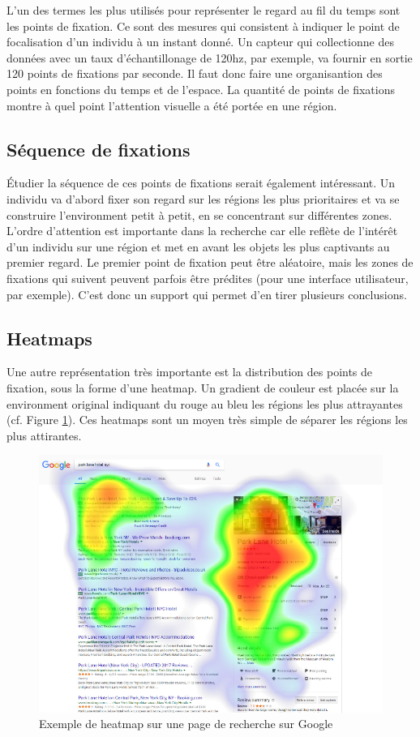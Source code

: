 \documentclass[12pt]{article}
\begin{document}
L'un des termes les plus utilisés pour représenter le regard au fil du temps
sont les points de fixation. Ce sont des mesures qui consistent à indiquer
le point de focalisation d'un individu à un instant donné. Un capteur qui
collectionne des données avec un taux d'échantillonage de 120hz, par exemple, va
fournir en sortie 120 points de fixations par seconde. Il faut donc faire une
organisantion des points en fonctions du temps et de l'espace. La quantité de
points de fixations montre à quel point l'attention visuelle a été portée en une
région.

\subsection{Séquence de fixations}

Étudier la séquence de ces points de fixations serait également intéressant. Un
individu va d'abord fixer son regard sur les régions les plus prioritaires et va
se construire l'environment petit à petit, en se concentrant sur différentes
zones. L'ordre d'attention est importante dans la recherche car elle reflète de
l'intérêt d'un individu sur une région et met en avant les objets les plus
captivants au premier regard. Le premier point de fixation peut être aléatoire,
mais les zones de fixations qui suivent peuvent parfois être prédites (pour
une interface utilisateur, par exemple). C'est donc un support qui permet d'en
tirer plusieurs conclusions.

\subsection{Heatmaps}

Une autre représentation très importante est la distribution des points de
fixation, sous la forme d'une heatmap. Un gradient de couleur est placée sur la
environment original indiquant du rouge au bleu les régions les plus
attrayantes (cf. Figure \ref{fig:heatmap}). Ces heatmaps sont un moyen très
simple de séparer les régions les plus attirantes.

\begin{figure}[ht]
  \includegraphics[width=\textwidth,keepaspectratio=true]{heatmap.png}
  \caption{Exemple de heatmap sur une page de recherche sur Google}
  \label{fig:heatmap}
\end{figure}
\end{document}
